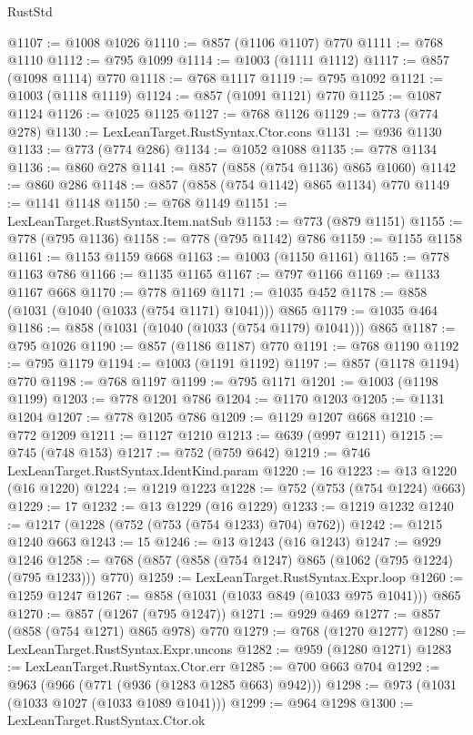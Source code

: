 \begin{lexlean}{RustStd}
\begin{coremodule}
@1107 := @1008 @1026
@1110 := @857 (@1106 @1107) @770
@1111 := @768 @1110
@1112 := @795 @1099
@1114 := @1003 (@1111 @1112)
@1117 := @857 (@1098 @1114) @770
@1118 := @768 @1117
@1119 := @795 @1092
@1121 := @1003 (@1118 @1119)
@1124 := @857 (@1091 @1121) @770
@1125 := @1087 @1124
@1126 := @1025 @1125
@1127 := @768 @1126
@1129 := @773 (@774 @278)
@1130 := LexLeanTarget.RustSyntax.Ctor.cons
@1131 := @936 @1130
@1133 := @773 (@774 @286)
@1134 := @1052 @1088
@1135 := @778 @1134
@1136 := @860 @278
@1141 := @857 (@858 (@754 @1136) @865 @1060)
@1142 := @860 @286
@1148 := @857 (@858 (@754 @1142) @865 @1134) @770
@1149 := @1141 @1148
@1150 := @768 @1149
@1151 := LexLeanTarget.RustSyntax.Item.natSub
@1153 := @773 (@879 @1151)
@1155 := @778 (@795 @1136)
@1158 := @778 (@795 @1142) @786
@1159 := @1155 @1158
@1161 := @1153 @1159 @668
@1163 := @1003 (@1150 @1161)
@1165 := @778 @1163 @786
@1166 := @1135 @1165
@1167 := @797 @1166
@1169 := @1133 @1167 @668
@1170 := @778 @1169
@1171 := @1035 @452
@1178 := @858 (@1031 (@1040 (@1033 (@754 @1171) @1041))) @865
@1179 := @1035 @464
@1186 := @858 (@1031 (@1040 (@1033 (@754 @1179) @1041))) @865
@1187 := @795 @1026
@1190 := @857 (@1186 @1187) @770
@1191 := @768 @1190
@1192 := @795 @1179
@1194 := @1003 (@1191 @1192)
@1197 := @857 (@1178 @1194) @770
@1198 := @768 @1197
@1199 := @795 @1171
@1201 := @1003 (@1198 @1199)
@1203 := @778 @1201 @786
@1204 := @1170 @1203
@1205 := @1131 @1204
@1207 := @778 @1205 @786
@1209 := @1129 @1207 @668
@1210 := @772 @1209
@1211 := @1127 @1210
@1213 := @639 (@997 @1211)
@1215 := @745 (@748 @153)
@1217 := @752 (@759 @642)
@1219 := @746 LexLeanTarget.RustSyntax.IdentKind.param
@1220 := 16
@1223 := @13 @1220 (@16 @1220)
@1224 := @1219 @1223
@1228 := @752 (@753 (@754 @1224) @663)
@1229 := 17
@1232 := @13 @1229 (@16 @1229)
@1233 := @1219 @1232
@1240 := @1217 (@1228 (@752 (@753 (@754 @1233) @704) @762))
@1242 := @1215 @1240 @663
@1243 := 15
@1246 := @13 @1243 (@16 @1243)
@1247 := @929 @1246
@1258 := @768 (@857 (@858 (@754 @1247) @865 (@1062 (@795 @1224) (@795 @1233))) @770)
@1259 := LexLeanTarget.RustSyntax.Expr.loop
@1260 := @1259 @1247
@1267 := @858 (@1031 (@1033 @849 (@1033 @975 @1041))) @865
@1270 := @857 (@1267 (@795 @1247))
@1271 := @929 @469
@1277 := @857 (@858 (@754 @1271) @865 @978) @770
@1279 := @768 (@1270 @1277)
@1280 := LexLeanTarget.RustSyntax.Expr.uncons
@1282 := @959 (@1280 @1271)
@1283 := LexLeanTarget.RustSyntax.Ctor.err
@1285 := @700 @663 @704
@1292 := @963 (@966 (@771 (@936 (@1283 @1285 @663) @942)))
@1298 := @973 (@1031 (@1033 @1027 (@1033 @1089 @1041)))
@1299 := @964 @1298
@1300 := LexLeanTarget.RustSyntax.Ctor.ok

\end{coremodule}
\end{lexlean}
